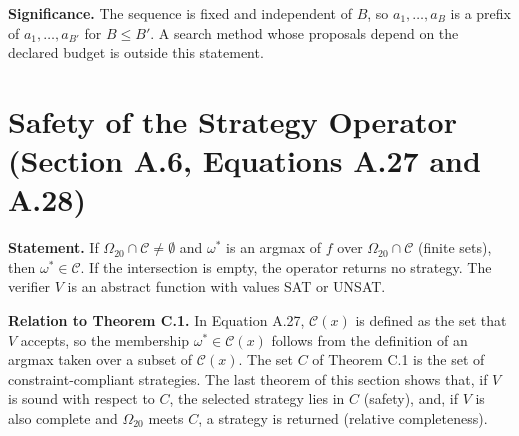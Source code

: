 \documentclass[11pt,a4paper]{article}
\begin{document}
	\noindent\textbf{Significance.} The sequence is fixed and independent of $B$, so $a_1,\dots,a_B$ is a prefix of $a_1,\dots,a_{B'}$ for $B\le B'$. A search method whose proposals depend on the declared budget is outside this statement.

	\section{Safety of the Strategy Operator (Section A.6, Equations A.27 and A.28)}

	\textbf{Statement.} If $\Omega_{20}\cap\mathcal{C}\neq\emptyset$ and $\omega^*$ is an argmax of $f$ over $\Omega_{20}\cap\mathcal{C}$ (finite sets), then $\omega^*\in\mathcal{C}$. If the intersection is empty, the operator returns no strategy. The verifier $V$ is an abstract function with values SAT or UNSAT.

\textbf{Relation to Theorem C.1.} In Equation A.27, $\mathcal{C}(x)$ is defined as the set that $V$ accepts, so the membership $\omega^*\in\mathcal{C}(x)$ follows from the definition of an argmax taken over a subset of $\mathcal{C}(x)$. The set $C$ of Theorem C.1 is the set of constraint-compliant strategies. The last theorem of this section shows that, if $V$ is sound with respect to $C$, the selected strategy lies in $C$ (safety), and, if $V$ is also complete and $\Omega_{20}$ meets $C$, a strategy is returned (relative completeness).
\end{document}
